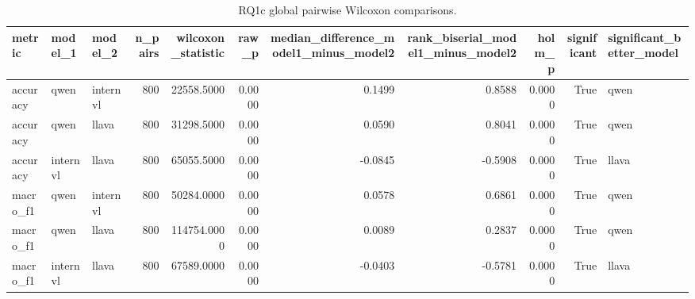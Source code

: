 \begin{table}[tbp]
\caption{RQ1c global pairwise Wilcoxon comparisons.}
\label{tab:rq1c_global_model_pairwise_wilcoxon}
\begin{tabular}{lllrrrrrrrl}
\toprule
metric & model\_1 & model\_2 & n\_pairs & wilcoxon\_statistic & raw\_p & median\_difference\_model1\_minus\_model2 & rank\_biserial\_model1\_minus\_model2 & holm\_p & significant & significant\_better\_model \\
\midrule
accuracy & qwen & internvl & 800 & 22558.5000 & 0.0000 & 0.1499 & 0.8588 & 0.0000 & True & qwen \\
accuracy & qwen & llava & 800 & 31298.5000 & 0.0000 & 0.0590 & 0.8041 & 0.0000 & True & qwen \\
accuracy & internvl & llava & 800 & 65055.5000 & 0.0000 & -0.0845 & -0.5908 & 0.0000 & True & llava \\
macro\_f1 & qwen & internvl & 800 & 50284.0000 & 0.0000 & 0.0578 & 0.6861 & 0.0000 & True & qwen \\
macro\_f1 & qwen & llava & 800 & 114754.0000 & 0.0000 & 0.0089 & 0.2837 & 0.0000 & True & qwen \\
macro\_f1 & internvl & llava & 800 & 67589.0000 & 0.0000 & -0.0403 & -0.5781 & 0.0000 & True & llava \\
\bottomrule
\end{tabular}
\end{table}
